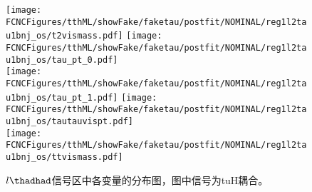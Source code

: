 \begin{figure}[H]
\centering
\texttt{[image: \\FCNCFigures/tthML/showFake/faketau/postfit/NOMINAL/reg1l2tau1bnj\_os/t2vismass.pdf]}
\texttt{[image: \\FCNCFigures/tthML/showFake/faketau/postfit/NOMINAL/reg1l2tau1bnj\_os/tau\_pt\_0.pdf]}
\\
\texttt{[image: \\FCNCFigures/tthML/showFake/faketau/postfit/NOMINAL/reg1l2tau1bnj\_os/tau\_pt\_1.pdf]}
\texttt{[image: \\FCNCFigures/tthML/showFake/faketau/postfit/NOMINAL/reg1l2tau1bnj\_os/tautauvispt.pdf]}
\\
\texttt{[image: \\FCNCFigures/tthML/showFake/faketau/postfit/NOMINAL/reg1l2tau1bnj\_os/ttvismass.pdf]}
\caption{$l\thadhad$信号区中各变量的分布图，图中信号为tuH耦合。}
\label{fig:var_reg1l2tau1bnj_os}
\end{figure}
